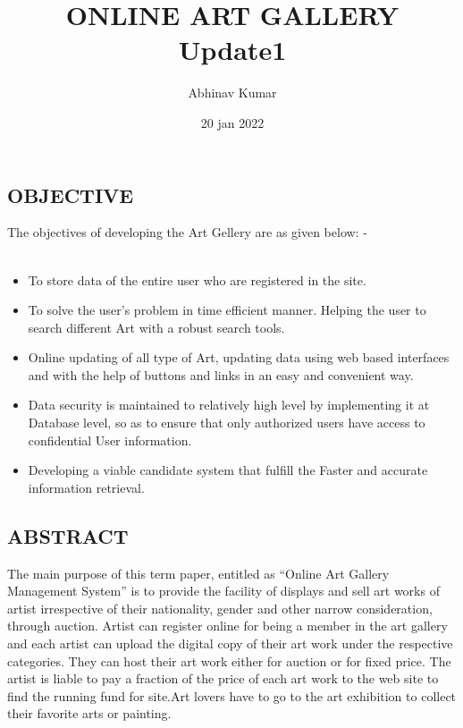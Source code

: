 \documentclass{article}
\title{ONLINE ART GALLERY \\ Update1}
\date{20 jan 2022}
\author{Abhinav Kumar }
\begin{document}
\maketitle
\begin{center}
   \section*{\textbf{OBJECTIVE}} 
\end{center}
The objectives of developing the Art Gellery are as given below: -
\\
\\
\begin{itemize}
    \item To store data of the entire user who are registered in the site.
    \item To solve the user’s problem in time efficient manner. Helping the user to search different Art with a robust search tools.
    \item Online updating of all type of Art, updating data using web based interfaces and with the help of buttons and links in an easy and convenient way.
    \item Data security is maintained to relatively high level by implementing it at Database level, so as to ensure that only authorized users have access to confidential User information.
    \item Developing a viable candidate system that fulfill the Faster and accurate information retrieval.
\end{itemize}
\begin{center}
   \section*{\textbf{ABSTRACT}} 
\end{center}
The main purpose of this term paper, entitled as “Online Art Gallery Management System” is to provide the facility of displays and sell art works of artist irrespective of their nationality, gender and other narrow consideration, through auction. Artist can register online for being a member in the art gallery and each artist can upload the digital copy of their art work under the respective categories. They can host their art work either for auction or for fixed price. The artist is liable to pay a fraction of the price of each art work to the web site to find the running fund for site.Art lovers have to go to the art exhibition to collect their favorite arts or painting.
\\
\end{document}
